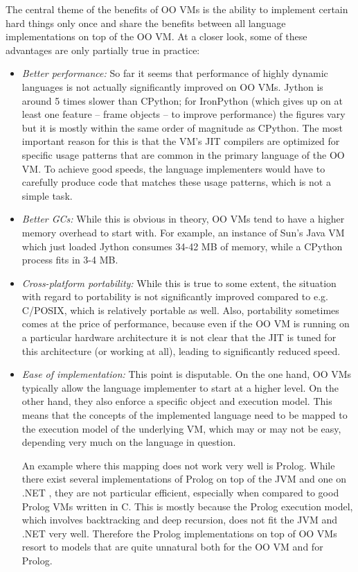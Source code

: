 \documentclass{llncs}
\begin{document}
\noindent
The central theme of the benefits of OO VMs is the ability to
implement certain hard things only once and share the benefits between
all language implementations on top of the OO VM.  At a closer look,
some of these advantages are only partially true in practice:

\begin{itemize}
\item
\emph{Better performance:} So far it seems that performance of highly dynamic
languages is not actually significantly improved on OO VMs. 
Jython is around 5
times slower than CPython; for IronPython (which
gives up on at least one feature -- frame objects -- to improve performance)
the figures vary but it is mostly
within the same order of magnitude as CPython. The most important reason for
this is that the VM's JIT compilers are optimized for specific usage patterns
that are common in the primary language of the OO VM. To achieve good speeds, the
language implementers would have to carefully produce code that matches these
usage patterns, which is not a simple task.

\item
\emph{Better GCs:} While this is obvious in theory, OO VMs tend to have a
higher memory overhead to start with.  For example, an instance of Sun's
Java VM which just loaded Jython consumes 34-42 MB of memory, while a
CPython process fits in 3-4 MB.

\item
\emph{Cross-platform portability:} While this is true to some extent, the
situation with regard to portability is not significantly improved compared to
e.g.  C/POSIX, which is relatively portable as well. Also, portability sometimes
comes at the price of performance, because even if the OO VM is running on a
particular hardware architecture it is not clear that the JIT is tuned for this
architecture (or working at all), leading to significantly reduced
speed.

\item
\emph{Ease of implementation:} This point is disputable. On the one hand, OO
VMs typically allow the language implementer to start at a higher level. On the
other hand, they also enforce a specific object and execution model. This means
that the concepts of the implemented language need to be mapped to the
execution model of the underlying VM, which may or may not be easy, depending very
much on the language in question.

An example where this mapping does not work very well is Prolog. While there
exist several implementations of Prolog on top of the JVM \cite{prologcafe}
\cite{InterProlog} and one on .NET \cite{psharp},
they are not particular efficient, especially when compared to good Prolog VMs
written in C. This is mostly because the Prolog execution model, which
involves backtracking and deep recursion, does not fit the JVM and .NET very
well. Therefore the Prolog implementations on top of OO VMs resort to models
that are quite unnatural both for the OO VM and for Prolog.


\end{itemize}
\end{document}
